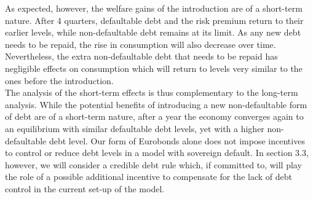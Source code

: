 As expected, however, the welfare gains of the introduction are of a short-term nature. After 4 quarters, defaultable debt and the risk premium return to their earlier levels, while non-defaultable debt remains at its limit. As any new debt needs to be repaid, the rise in consumption will also decrease over time. Nevertheless, the extra non-defaultable debt that needs to be repaid has negligible effects on consumption which will return to levels very similar to the ones before the introduction.\\ 

The analysis of the short-term effects is thus complementary to the long-term analysis. While the potential benefits of introducing a new non-defaultable form of debt are of a short-term nature, after a year the economy converges again to an equilibrium with similar defaultable debt levels, yet with a higher non-defaultable debt level. Our form of Eurobonds alone does not impose incentives to control or reduce debt levels in a model with sovereign default. In section 3.3, however, we will consider a credible debt rule which, if committed to, will play the role of a possible additional incentive to compensate for the lack of debt control in the current set-up of the model.\\

